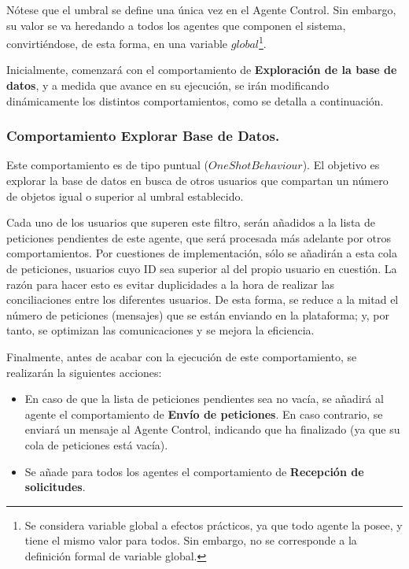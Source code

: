 Nótese que el umbral se define una única vez en el Agente Control. Sin embargo, su valor se va heredando a todos los agentes que componen el sistema, convirtiéndose, de esta forma, en una variable $global$\footnote{Se considera variable global a efectos prácticos, ya que todo agente la posee, y tiene el mismo valor para todos. Sin embargo, no se corresponde a la definición formal de variable global.}.

Inicialmente, comenzará con el comportamiento de {\bf Exploración de la base de datos}, y a medida que avance en su ejecución, se irán modificando dinámicamente los distintos comportamientos, como se detalla a continuación.

\subsubsection{Comportamiento Explorar Base de Datos.}

Este comportamiento es de tipo puntual ($OneShotBehaviour$). El objetivo es explorar la base de datos en busca de otros usuarios que compartan un número de objetos igual o superior al umbral establecido.

Cada uno de los usuarios que superen este filtro, serán añadidos a la lista de peticiones pendientes de este agente, que será procesada más adelante por otros comportamientos. Por cuestiones de implementación, sólo se añadirán a esta cola de peticiones, usuarios cuyo ID sea superior al del propio usuario en cuestión. La razón para hacer esto es evitar duplicidades a la hora de realizar las conciliaciones entre los diferentes usuarios. De esta forma, se reduce a la mitad el número de peticiones (mensajes) que se están enviando en la plataforma; y, por tanto, se optimizan las comunicaciones y se mejora la eficiencia.

Finalmente, antes de acabar con la ejecución de este comportamiento, se realizarán la siguientes acciones:

\begin{itemize}
	\item En caso de que la lista de peticiones pendientes sea no vacía, se añadirá al agente el comportamiento de {\bf Envío de peticiones}. En caso contrario, se enviará un mensaje al Agente Control, indicando que ha finalizado (ya que su cola de peticiones está vacía).
	\item Se añade para todos los agentes el comportamiento de {\bf Recepción de solicitudes}.
\end{itemize}

